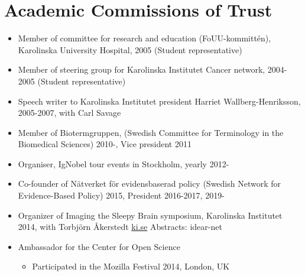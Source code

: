 \documentclass[10pt,a4paper,twocolumn]{article}
\begin{document}
\section{Academic Commissions of Trust}
\begin{itemize}

    \item Member of committee for research and education (FoUU-kommittén), Karolinska University Hospital, 2005 (Student representative)
    
    

    \item Member of steering group for Karolinska Institutet Cancer network, 2004-2005 (Student representative)
    
    

    \item Speech writer to Karolinska Institutet president Harriet Wallberg-Henriksson, 2005-2007, with Carl Savage
    
    

    \item Member of Biotermgruppen, (Swedish Committee for Terminology in the Biomedical Sciences) 2010-, Vice president 2011
    
    

    \item Organiser, IgNobel tour events in Stockholm, yearly 2012-
    
    

    \item Co-founder of Nätverket för evidensbaserad policy (Swedish Network for Evidence-Based Policy) 2015, President 2016-2017, 2019-
    
    

    \item Organizer of Imaging the Sleepy Brain symposium, Karolinska Institutet 2014, with Torbjörn Åkerstedt \href{https://ki.se}{ki.se} Abstracts: idear-net
    
    

    \item Ambassador for the Center for Open Science
    
    \begin{itemize}
    
        
        \item Participated in the Mozilla Festival 2014, London, UK
        
    
    \end{itemize}
    
    


\end{itemize}
\end{document}
